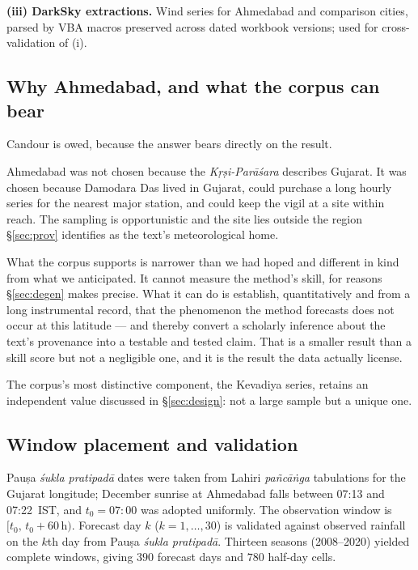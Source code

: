 \documentclass[11pt,a4paper]{article}
\newcommand{\skt}[1]{\textcolor{skt}{\textit{#1}}}
\begin{document}
\textbf{(iii) DarkSky extractions.} Wind series for Ahmedabad and comparison cities, parsed by VBA macros preserved across dated workbook versions; used for cross-validation of (i).

\subsection{Why Ahmedabad, and what the corpus can bear}
\label{sec:whyhere}

Candour is owed, because the answer bears directly on the result.

Ahmedabad was not chosen because the \skt{Kṛṣi-Parāśara} describes Gujarat. It was chosen because Damodara Das lived in Gujarat, could purchase a long hourly series for the nearest major station, and could keep the vigil at a site within reach. The sampling is opportunistic and the site lies outside the region \S\ref{sec:prov} identifies as the text's meteorological home.

What the corpus supports is narrower than we had hoped and different in kind from what we anticipated. It cannot measure the method's skill, for reasons \S\ref{sec:degen} makes precise. What it can do is establish, quantitatively and from a long instrumental record, that the phenomenon the method forecasts does not occur at this latitude --- and thereby convert a scholarly inference about the text's provenance into a testable and tested claim. That is a smaller result than a skill score but not a negligible one, and it is the result the data actually license.

The corpus's most distinctive component, the Kevadiya series, retains an independent value discussed in \S\ref{sec:design}: not a large sample but a unique one.

\subsection{Window placement and validation}

Pauṣa \skt{śukla pratipadā} dates were taken from Lahiri \skt{pañcāṅga} tabulations for the Gujarat longitude; December sunrise at Ahmedabad falls between 07:13 and 07:22~IST, and $t_0=07{:}00$ was adopted uniformly. The observation window is $[t_0,\,t_0+60\,\mathrm{h})$. Forecast day $k$ ($k=1,\dots,30$) is validated against observed rainfall on the $k$th day from Pauṣa \skt{śukla pratipadā}. Thirteen seasons (2008--2020) yielded complete windows, giving $390$ forecast days and $780$ half-day cells.
\end{document}
